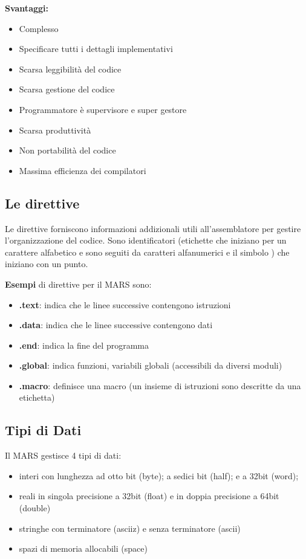 \documentclass[12pt]{article} %
\begin{document}
\newpage
\textbf{Svantaggi:}
\begin{itemize}
\item Complesso
\item Specificare tutti i dettagli implementativi
\item Scarsa leggibilità del codice
\item Scarsa gestione del codice 
\item Programmatore è supervisore e super gestore 
\item Scarsa produttività 
\item Non portabilità del codice 
\item Massima efficienza dei compilatori\par\medskip\noindent
\end{itemize}
\subsection{Le direttive}
Le direttive forniscono informazioni addizionali utili all’assemblatore per gestire l’organizzazione del codice. Sono identificatori (etichette che iniziano per un carattere alfabetico e sono seguiti da caratteri alfanumerici e il simbolo \textunderscore) che iniziano con un punto.\par\medskip\noindent
\textbf{Esempi} di direttive per il MARS sono: 
\begin{itemize}
\item \textbf{.text}: indica che le linee successive contengono istruzioni
\item \textbf{.data}: indica che le linee successive contengono dati 
\item \textbf{.end}: indica la fine del programma 
\item \textbf{.global}: indica funzioni, variabili globali (accessibili da diversi moduli) 
\item \textbf{.macro}: definisce una macro (un insieme di istruzioni sono descritte da una etichetta)\par\medskip\noindent 
\end{itemize}
\subsection{Tipi di Dati}
Il MARS gestisce 4 tipi di dati: 
\begin{itemize}
\item interi con lunghezza ad otto bit (byte); a sedici bit (half); e a 32bit (word); 
\item reali in singola precisione a 32bit (float) e in doppia precisione a 64bit (double) 
\item stringhe con terminatore (asciiz) e senza terminatore (ascii) 
\item spazi di memoria allocabili (space)
\end{itemize}
\end{document}
